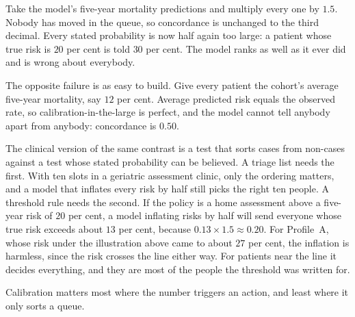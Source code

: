 \begin{reading}
Take the model's five-year mortality predictions and multiply every one by $1.5$. Nobody has moved in the queue, so concordance is unchanged to the third decimal. Every stated probability is now half again too large: a patient whose true risk is $20$ per cent is told $30$ per cent. The model ranks as well as it ever did and is wrong about everybody.

The opposite failure is as easy to build. Give every patient the cohort's average five-year mortality, say $12$ per cent. Average predicted risk equals the observed rate, so calibration-in-the-large is perfect, and the model cannot tell anybody apart from anybody: concordance is $0.50$.

The clinical version of the same contrast is a test that sorts cases from non-cases against a test whose stated probability can be believed. A triage list needs the first. With ten slots in a geriatric assessment clinic, only the ordering matters, and a model that inflates every risk by half still picks the right ten people. A threshold rule needs the second. If the policy is a home assessment above a five-year risk of $20$ per cent, a model inflating risks by half will send everyone whose true risk exceeds about $13$ per cent, because $0.13\times1.5\approx0.20$. For Profile~A, whose risk under the illustration above came to about $27$ per cent, the inflation is harmless, since the risk crosses the line either way. For patients near the line it decides everything, and they are most of the people the threshold was written for.

Calibration matters most where the number triggers an action, and least where it only sorts a queue.
\end{reading}

